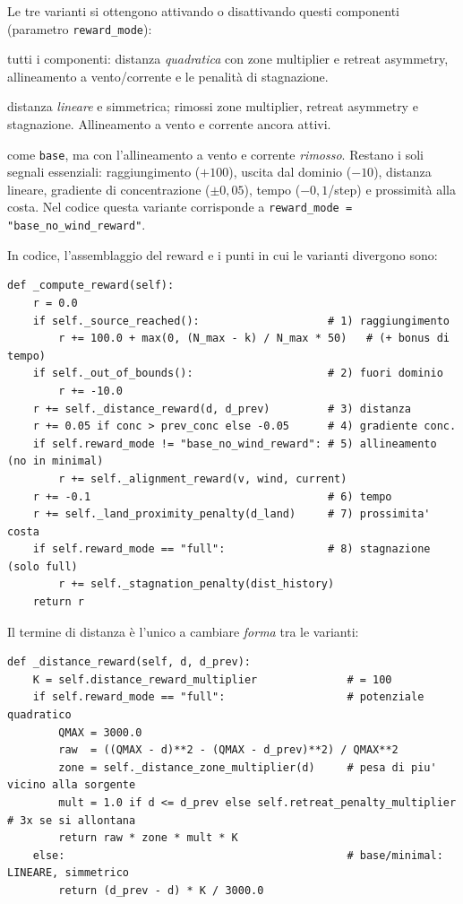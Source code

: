 Le tre varianti si ottengono attivando o disattivando questi componenti (parametro
\texttt{reward\_mode}):
\begin{description}[leftmargin=1.4em, style=nextline]
    \item[\texttt{full}] tutti i componenti: distanza \emph{quadratica} con zone multiplier e
          retreat asymmetry, allineamento a vento/corrente e le penalit\`a di stagnazione.
    \item[\texttt{base}] distanza \emph{lineare} e simmetrica; rimossi zone multiplier, retreat
          asymmetry e stagnazione. Allineamento a vento e corrente ancora attivi.
    \item[\texttt{minimal}] come \texttt{base}, ma con l'allineamento a vento e corrente
          \emph{rimosso}. Restano i soli segnali essenziali: raggiungimento ($+100$), uscita
          dal dominio ($-10$), distanza lineare, gradiente di concentrazione ($\pm 0{,}05$),
          tempo ($-0{,}1$/step) e prossimit\`a alla costa. Nel codice questa variante
          corrisponde a \texttt{reward\_mode = "base\_no\_wind\_reward"}.
\end{description}

In codice, l'assemblaggio del reward e i punti in cui le varianti divergono sono:

\begin{lstlisting}
def _compute_reward(self):
    r = 0.0
    if self._source_reached():                    # 1) raggiungimento
        r += 100.0 + max(0, (N_max - k) / N_max * 50)   # (+ bonus di tempo)
    if self._out_of_bounds():                     # 2) fuori dominio
        r += -10.0
    r += self._distance_reward(d, d_prev)         # 3) distanza
    r += 0.05 if conc > prev_conc else -0.05      # 4) gradiente conc.
    if self.reward_mode != "base_no_wind_reward": # 5) allineamento (no in minimal)
        r += self._alignment_reward(v, wind, current)
    r += -0.1                                     # 6) tempo
    r += self._land_proximity_penalty(d_land)     # 7) prossimita' costa
    if self.reward_mode == "full":                # 8) stagnazione (solo full)
        r += self._stagnation_penalty(dist_history)
    return r
\end{lstlisting}

Il termine di distanza \`e l'unico a cambiare \emph{forma} tra le varianti:

\begin{lstlisting}
def _distance_reward(self, d, d_prev):
    K = self.distance_reward_multiplier              # = 100
    if self.reward_mode == "full":                   # potenziale quadratico
        QMAX = 3000.0
        raw  = ((QMAX - d)**2 - (QMAX - d_prev)**2) / QMAX**2
        zone = self._distance_zone_multiplier(d)     # pesa di piu' vicino alla sorgente
        mult = 1.0 if d <= d_prev else self.retreat_penalty_multiplier   # 3x se si allontana
        return raw * zone * mult * K
    else:                                            # base/minimal: LINEARE, simmetrico
        return (d_prev - d) * K / 3000.0
\end{lstlisting}

